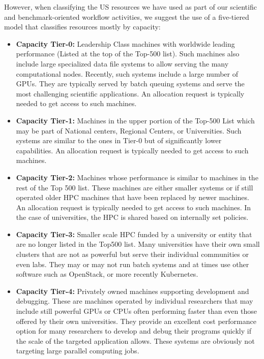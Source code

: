 \documentclass[utf8]{FrontiersinVancouver} %
\begin{document}
However, when classifying the US resources we have used as part of our scientific and benchmark-oriented workflow activities, we suggest the use of  a five-tiered model that classifies resources mostly by capacity:

\begin{itemize}
\item {\bf Capacity Tier-0:} Leadership Class machines with worldwide leading
  performance (Listed at the top of the Top-500 list). Such machines also include large specialized data file systems to allow serving the many computational nodes. Recently, such systems include a large number of GPUs. They are typically served by batch queuing systems and serve the most challenging scientific applications. An allocation request is typically needed to get access to such machines.
\item {\bf Capacity Tier-1:} Machines in the upper portion of the Top-500 List which may be part of   National centers, Regional Centers, or Universities. Such systems are similar to the ones in Tier-0 but of significantly lower capabilities.
An allocation request is typically needed to get access to such machines.
\item {\bf Capacity Tier-2:} Machines whose performance is similar to machines
  in the rest of the Top 500 list. These machines are either smaller systems or if still operated older HPC machines that have been replaced by newer machines.
  An allocation request is typically needed to get access to such machines. In the case of universities, the HPC is shared based on internally set policies.
\item {\bf Capacity Tier-3:} Smaller scale HPC funded by a university or entity
  that are no longer listed in the Top500 list. Many universities have their own small clusters that are not as powerful but serve their individual communities or even labs. They may or may not run batch systems and at times use other software such as OpenStack, or more recently Kubernetes. 
\item {\bf Capacity Tier-4:} Privately owned machines supporting development
  and debugging. These are machines operated by individual researchers that may include still powerful GPUs or CPUs often performing faster than even those offered by their own universities. They provide an excellent cost performance option for many researchers to develop and debug their programs quickly if the scale of the targeted application allows. These systems are obviously not targeting large parallel computing jobs.
  
\end{itemize}
\end{document}
